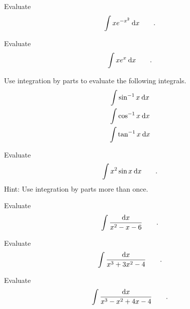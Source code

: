 \begin{hwsection}
\begin{hw}
Evaluate
\begin{equation*}
  \int x e^{-x^2} \:\textup{d} x \qquad .
\end{equation*}
\end{hw}

\begin{hw}
Evaluate
\begin{equation*}
  \int x e^x \:\textup{d} x \qquad .
\end{equation*}
\end{hw}

\begin{hw}
Use integration by parts to evaluate the following integrals.
\begin{gather*}
  \int \sin^{-1} x\:\textup{d} x \\
  \int \cos^{-1} x\:\textup{d} x \\
  \int \tan^{-1} x\:\textup{d} x 
\end{gather*}
\end{hw}

\begin{hw}
Evaluate
\begin{equation*}
  \int x^2 \sin x \:\textup{d} x \qquad .
\end{equation*}
Hint: Use integration by parts more than once.
\end{hw}

\begin{hw}
Evaluate
\begin{equation*}
  \int \frac{\textup{d} x}{x^2-x-6} \qquad .
\end{equation*}
\end{hw}

\begin{hw}
Evaluate
\begin{equation*}
  \int \frac{\textup{d} x}{x^3+3x^2-4} \qquad .
\end{equation*}
\end{hw}

\begin{hw}
Evaluate
\begin{equation*}
  \int \frac{\textup{d} x}{x^3-x^2+4x-4} \qquad .
\end{equation*}
\end{hw}

\end{hwsection}
